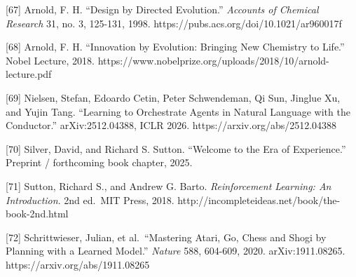 \documentclass[11pt]{article}
\begin{document}
{[}67{]} Arnold, F. H. ``Design by Directed Evolution.'' \emph{Accounts of Chemical Research} 31, no. 3, 125-131, 1998. https://pubs.acs.org/doi/10.1021/ar960017f

{[}68{]} Arnold, F. H. ``Innovation by Evolution: Bringing New Chemistry to Life.'' Nobel Lecture, 2018. https://www.nobelprize.org/uploads/2018/10/arnold-lecture.pdf

{[}69{]} Nielsen, Stefan, Edoardo Cetin, Peter Schwendeman, Qi Sun, Jinglue Xu, and Yujin Tang. ``Learning to Orchestrate Agents in Natural Language with the Conductor.'' arXiv:2512.04388, ICLR 2026. https://arxiv.org/abs/2512.04388

{[}70{]} Silver, David, and Richard S. Sutton. ``Welcome to the Era of Experience.'' Preprint / forthcoming book chapter, 2025.

{[}71{]} Sutton, Richard S., and Andrew G. Barto. \emph{Reinforcement Learning: An Introduction}. 2nd ed.~MIT Press, 2018. http://incompleteideas.net/book/the-book-2nd.html

{[}72{]} Schrittwieser, Julian, et al.~``Mastering Atari, Go, Chess and Shogi by Planning with a Learned Model.'' \emph{Nature} 588, 604-609, 2020. arXiv:1911.08265. https://arxiv.org/abs/1911.08265
\end{document}
